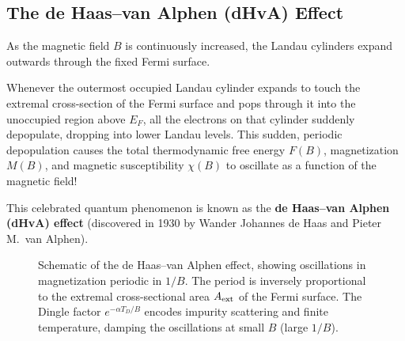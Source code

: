 \documentclass[11pt,a4paper]{article}
\begin{document}
\subsection{The de Haas--van Alphen (dHvA) Effect}
As the magnetic field $B$ is continuously increased, the Landau cylinders expand outwards through the fixed Fermi surface. 

Whenever the outermost occupied Landau cylinder expands to touch the extremal cross-section of the Fermi surface and pops through it into the unoccupied region above $E_F$, all the electrons on that cylinder suddenly depopulate, dropping into lower Landau levels. This sudden, periodic depopulation causes the total thermodynamic free energy $F(B)$, magnetization $M(B)$, and magnetic susceptibility $\chi(B)$ to oscillate as a function of the magnetic field!

This celebrated quantum phenomenon is known as the \textbf{de Haas--van Alphen (dHvA) effect} (discovered in 1930 by Wander Johannes de Haas and Pieter M.~van Alphen).

\begin{figure}[h]
\centering
{}
\caption{Schematic of the de Haas--van Alphen effect, showing oscillations in magnetization periodic in $1/B$. The period is inversely proportional to the extremal cross-sectional area $A_{\rm ext}$ of the Fermi surface. The Dingle factor $e^{-\alpha T_D/B}$ encodes impurity scattering and finite temperature, damping the oscillations at small $B$ (large $1/B$).}
\label{fig:dhva}
\end{figure}
\end{document}

